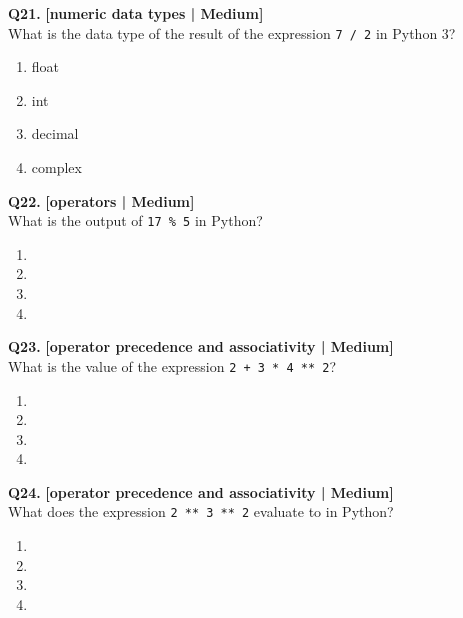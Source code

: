 \noindent\textbf{Q21.} \hfill {\small\color{LPUOrange}\textbf{[numeric data types | Medium]}}\\[2pt]
What is the data type of the result of the expression \texttt{7 / 2} in Python 3?

\begin{enumerate}[label=(\alph*),topsep=2pt,itemsep=1pt,partopsep=0pt,parsep=0pt]
    \item \relax float
    \item \relax int
    \item \relax decimal
    \item \relax complex
\end{enumerate}
\vspace{2mm}

\noindent\textbf{Q22.} \hfill {\small\color{LPUOrange}\textbf{[operators | Medium]}}\\[2pt]
What is the output of \texttt{17 \% 5} in Python?

\begin{enumerate}[label=(\alph*),topsep=2pt,itemsep=1pt,partopsep=0pt,parsep=0pt]
    \item {}
    \item {}
    \item {}
    \item {}
\end{enumerate}
\vspace{2mm}

\noindent\textbf{Q23.} \hfill {\small\color{LPUOrange}\textbf{[operator precedence and associativity | Medium]}}\\[2pt]
What is the value of the expression \texttt{2 + 3 * 4 ** 2}?

\begin{enumerate}[label=(\alph*),topsep=2pt,itemsep=1pt,partopsep=0pt,parsep=0pt]
    \item {}
    \item {}
    \item {}
    \item {}
\end{enumerate}
\vspace{2mm}

\noindent\textbf{Q24.} \hfill {\small\color{LPUOrange}\textbf{[operator precedence and associativity | Medium]}}\\[2pt]
What does the expression \texttt{2 ** 3 ** 2} evaluate to in Python?

\begin{enumerate}[label=(\alph*),topsep=2pt,itemsep=1pt,partopsep=0pt,parsep=0pt]
    \item {}
    \item {}
    \item {}
    \item {}
\end{enumerate}
\vspace{2mm}

